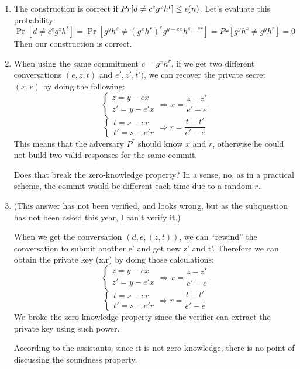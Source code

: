 \begin{solution}
	\begin{enumerate}
		\item The construction is correct if $Pr[d \neq c^eg^zh^t] \leq \epsilon(n)$.
		Let's evaluate this probability:
		\[ \Pr[d \neq c^eg^zh^t] = \Pr[g^y h^s \neq (g^x h^r)^e g^{y-ex}h^{s-er}]  = Pr[g^yh^s \neq g^y h^r] = 0 \]
		Then our construction is correct.

		\item When using the same commitment $c=g^xh^r$, if we get two different conversations $(e, z, t)$ and $e', z', t')$, we can recover the private secret $(x, r)$ by doing the following:
		\[ \begin{cases} z = y - ex \\ z' = y - e'x \end{cases} \Rightarrow x = \frac{z-z'}{e'-e} \]
		\[ \begin{cases} t = s - er \\ t' = s - e'r \end{cases} \Rightarrow r = \frac{t-t'}{e'-e} \]
		This means that the adversary $P^*$ should know $x$ and $r$, otherwise he could not build two valid responses for the same commit.

		Does that break the zero-knowledge property?
		In a sense, no, as in a practical scheme, the commit would be different each time due to a random $r$.

		\item (This answer has not been verified, and looks wrong, but as the subquestion has not been asked this year, I can't verify it.)

		When we get the conversation $(d, e, (z,t))$, we can ``rewind'' the conversation to submit another e' and get new z' and t'. Therefore we can obtain the private key (x,r) by doing those calculations:
		\[ \begin{cases} z = y - ex \\ z' = y - e'x \end{cases} \Rightarrow x = \frac{z-z'}{e'-e} \]
		\[ \begin{cases} t = s - er \\ t' = s - e'r \end{cases} \Rightarrow r = \frac{t-t'}{e'-e} \]
		We broke the zero-knowledge property since the verifier can extract the private key using such power.

		According to the assistants, since it is not zero-knowledge, there is no point of discussing the soundness property.


\end{enumerate}
\end{solution}
